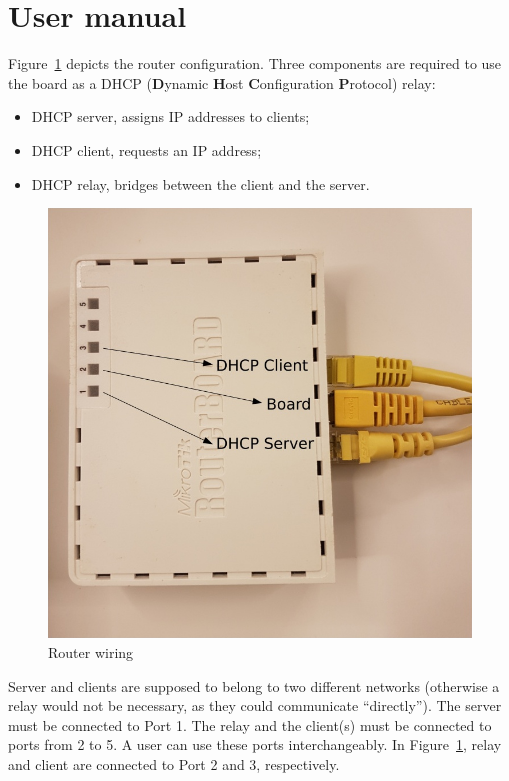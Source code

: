 \section{User manual}
Figure~\ref{fig:router} depicts the router configuration. Three components are required to use the board as a DHCP (\textbf{D}ynamic \textbf{H}ost \textbf{C}onfiguration \textbf{P}rotocol) relay:
\begin{itemize}
	\item DHCP server, assigns IP addresses to clients;
	\item DHCP client, requests an IP address;
	\item DHCP relay, bridges between the client and the server.
\end{itemize}

\begin{figure}[h]
	\centering
	\includegraphics[scale=0.7]{images/router}
	\caption{Router wiring}
	\label{fig:router}
\end{figure}

Server and clients are supposed to belong to two different networks (otherwise a relay would not be necessary, as they could communicate ``directly''). The server must be connected to Port 1. The relay and the client(s) must be connected to ports from 2 to 5. A user can use these ports interchangeably. In Figure~\ref{fig:router}, relay and client are connected to Port 2 and 3, respectively. 

